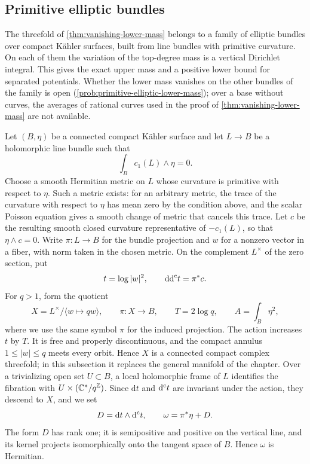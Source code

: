 \subsection{Primitive elliptic bundles}
\label{sec:primitive-elliptic-bundles}

The threefold of \cref{thm:vanishing-lower-mass} belongs to a family of elliptic bundles over compact K\"ahler surfaces, built from line bundles with primitive curvature. On each of them the variation of the top-degree mass is a vertical Dirichlet integral. This gives the exact upper mass and a positive lower bound for separated potentials. Whether the lower mass vanishes on the other bundles of the family is open (\cref{prob:primitive-elliptic-lower-mass}); over a base without curves, the averages of rational curves used in the proof of \cref{thm:vanishing-lower-mass} are not available.

Let $(B,\eta)$ be a connected compact K\"ahler surface and let $L\to B$ be a holomorphic line bundle such that
\[
 \int_Bc_1(L)\wedge\eta=0.
\]
Choose a smooth Hermitian metric on $L$ whose curvature is primitive with respect to $\eta$. Such a metric exists: for an arbitrary metric, the trace of the curvature with respect to $\eta$ has mean zero by the condition above, and the scalar Poisson equation gives a smooth change of metric that cancels this trace. Let $c$ be the resulting smooth closed curvature representative of $-c_1(L)$, so that $\eta\wedge c=0$. Write $\pi\colon L\to B$ for the bundle projection and $w$ for a nonzero vector in a fiber, with norm taken in the chosen metric. On the complement $L^\times$ of the zero section, put
\[
 t=\log|w|^2,\qquad \mathrm{dd}^{\mathrm{c}} t=\pi^*c.
\]
For $q>1$, form the quotient
\[
 X=L^\times/\langle w\mapsto qw\rangle,
 \qquad \pi\colon X\longrightarrow B,
 \qquad T=2\log q,
 \qquad A=\int_B\eta^2,
\]
where we use the same symbol $\pi$ for the induced projection. The action increases $t$ by $T$. It is free and properly discontinuous, and the compact annulus $1\leq|w|\leq q$ meets every orbit. Hence $X$ is a connected compact complex threefold; in this subsection it replaces the general manifold of the chapter. Over a trivializing open set $U\subset B$, a local holomorphic frame of $L$ identifies the fibration with $U\times(\mathbb C^*/q^{\mathbb Z})$.
Since $\mathrm{d}t$ and $\mathrm d^{\mathrm c} t$ are invariant under the action, they descend to $X$, and we set
\[
 D=\mathrm{d}t\wedge\mathrm d^{\mathrm c} t,\qquad \omega=\pi^*\eta+D.
\]
The form $D$ has rank one; it is semipositive and positive on the vertical line, and its kernel projects isomorphically onto the tangent space of $B$. Hence $\omega$ is Hermitian.

